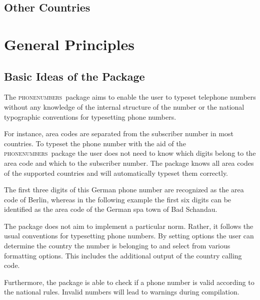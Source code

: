 \documentclass[numbers=noenddot]{scrreprt}
\newcommand*\Paket[1]{\textsc{#1}}
\newcommand\phone{\textcolor{cnltx}{\Paket{phone\-numbers}}}
\begin{document}
\section{Other Countries}
\begin{sidebyside}
\end{sidebyside}

\begin{sidebyside}
\end{sidebyside}

\chapter{General Principles}
\section{Basic Ideas of the Package}
The \phone\ package aims to enable the user to typeset telephone numbers without any knowledge of the internal structure of the number or the national typographic conventions for typesetting phone numbers.

For instance, area codes are separated from the subscriber number in most countries. To typeset the phone number with the aid of the \phone\ package the user does not need to know which digits belong to the area code and which to the subscriber number. The package knows all area codes of the supported countries and will automatically typeset them correctly.
\begin{sidebyside}
\end{sidebyside}
The first three digits of this German phone number are recognized as the area code of Berlin, whereas in the following example the first six digits can be identified as the area code of the German spa town of Bad Schandau.
\begin{sidebyside}
\end{sidebyside}

The package does not aim to implement a particular norm. Rather, it follows the usual conventions for typesetting phone numbers. By setting options the user can determine the country the number is belonging to and select from various formatting options. This includes the additional output of the country calling code.

Furthermore, the package is able to check if a phone number is valid according to the national rules. Invalid numbers will lead to warnings during compilation.
\end{document}
